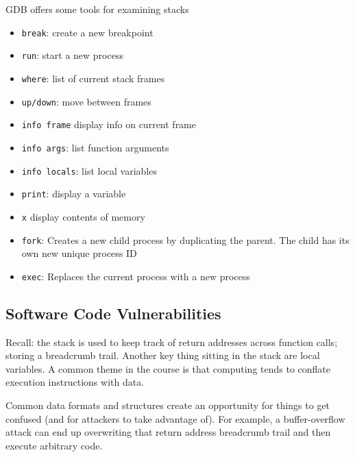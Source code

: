 \documentclass[../notes.tex]{subfiles}
\begin{document}
GDB offers some tools for examining stacks

\begin{itemize}
    \item \texttt{break}: create a new breakpoint
    \item \texttt{run}: start a new process
    \item \texttt{where}: list of current stack frames
    \item \texttt{up/down}: move between frames
    \item \texttt{info frame} display info on current frame
    \item \texttt{info args}: list function arguments
    \item \texttt{info locals}: list local variables
    \item \texttt{print}: display a variable
    \item \texttt{x} display contents of memory
\end{itemize}

\begin{itemize}
    \item \texttt{fork}: Creates a new child process by duplicating the parent. The child has its own new unique process ID
    \item \texttt{exec}: Replaces the current process with a new process
\end{itemize}


\subsection{Software Code Vulnerabilities}


Recall: the stack is used to keep track of return addresses across function calls; storing a breadcrumb trail.
Another key thing sitting in the stack are local variables. 
A common theme in the course is that computing tends to conflate execution instructions with data.

Common data formats and structures create an opportunity for things to get confused (and for attackers to take advantage of). 
For example, a buffer-overflow attack can end up overwriting that return address breadcrumb trail and then execute arbitrary code.
\end{document}
